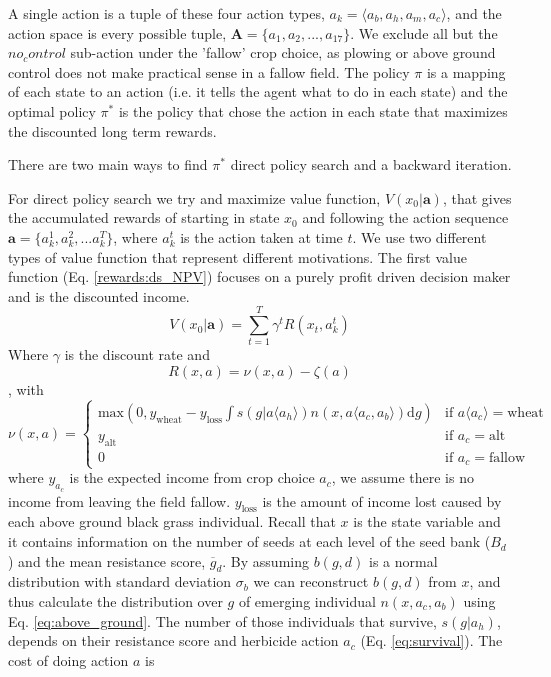 \documentclass[12pt, a4paper]{article}
\begin{document}
A single action is a tuple of these four action types, $a_k = \langle a_b, a_h, a_m, a_c \rangle$, and the action space is every possible tuple, $\textbf{A} = \{a_1, a_2, ..., a_{17}\}$. We exclude all but the $no_control$ sub-action under the 'fallow' crop choice, as plowing or above ground control does not make practical sense in a fallow field. The policy $\pi$ is a mapping of each state to an action (i.e. it tells the agent what to do in each state) and the optimal policy $\pi^*$ is the policy that chose the action in each state that maximizes the discounted long term rewards. 

There are two main ways to find $\pi^*$ direct policy search and a backward iteration. 

For direct policy search we try and maximize value function, $V(x_0|\mathbf{a})$, that gives the accumulated rewards of starting in state $x_0$ and following the action sequence $\mathbf{a} = \{a_k^1, a_k^2, ... a_k^T\}$, where $a_k^t$ is the action taken at time $t$. We use two different types of value function that represent different motivations. The first value function (Eq. \ref{rewards:ds_NPV}) focuses on a purely profit driven decision maker and is the discounted income. 
\begin{equation}\label{rewards:ds_NPV}
	V(x_0|\mathbf{a}) = \sum_{t = 1}^{T} \gamma^t R(x_t, a_k^t) 
\end{equation}
Where $\gamma$ is the discount rate and 
\begin{equation}\label{rewards:immediate}
	R(x, a) = \nu(x, a) - \zeta(a)  
\end{equation},
with
\begin{equation}
	\nu(x, a) = \begin{cases}
		\text{max}(0, y_\text{wheat} - y_\text{loss}\int s(g|a\langle a_h \rangle)n(x, a\langle a_c, a_b \rangle)\text{d}g) &\text{if } a\langle a_c \rangle = \text{wheat}\\
		y_\text{alt} &\text{if } a_c = \text{alt}\\
		0 &\text{if } a_c = \text{fallow} 
	\end{cases}
\end{equation}
where $y_{a_c}$ is the expected income from crop choice $a_c$, we assume there is no income from leaving the field fallow. $y_\text{loss}$ is the amount of income lost caused by each above ground black grass individual. Recall that $x$ is the state variable and it contains information on the number of seeds at each level of the seed bank ($B_d$) and the mean resistance score, $\overline{g}_d$. By assuming $b(g, d)$ is a normal distribution with standard deviation $\sigma_b$ we can reconstruct $b(g, d)$ from $x$, and thus calculate the distribution over $g$ of emerging individual $n(x, a_c, a_b)$ using Eq. \ref{eq:above_ground}. The number of those individuals that survive, $s(g|a_h)$, depends on their resistance score and herbicide action $a_c$ (Eq. \ref{eq:survival}). The cost of doing action $a$ is
\end{document}
